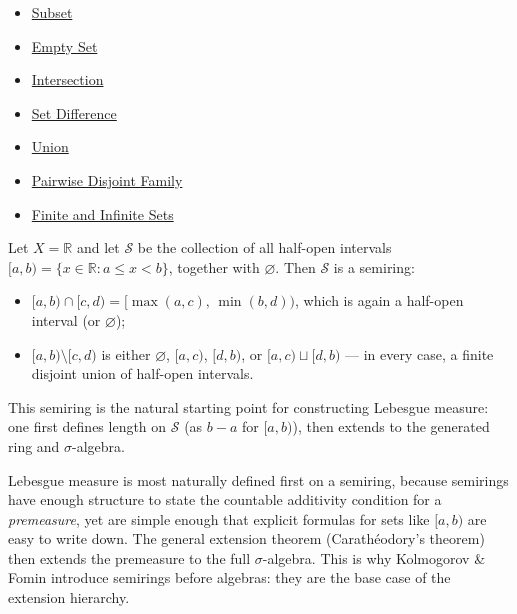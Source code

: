 \begin{dependencies}
\begin{itemize}
  \item \hyperref[def:subset]{Subset}
  \item \hyperref[def:empty-set]{Empty Set}
  \item \hyperref[def:intersection]{Intersection}
  \item \hyperref[def:set-difference]{Set Difference}
  \item \hyperref[def:union]{Union}
  \item \hyperref[def:pairwise-disjoint]{Pairwise Disjoint Family}
  \item \hyperref[def:finite-infinite]{Finite and Infinite Sets}
\end{itemize}
\end{dependencies}

\begin{example*}
\label{ex:semiring-intervals}
Let $X = \mathbb{R}$ and let $\mathcal{S}$ be the collection of all half-open
intervals $[a, b) = \{x \in \mathbb{R} : a \leq x < b\}$, together with
$\varnothing$. Then $\mathcal{S}$ is a semiring:
\begin{itemize}
\item $[a,b) \cap [c,d) = [\max(a,c),\, \min(b,d))$, which is again a half-open
  interval (or $\varnothing$);
\item $[a,b) \setminus [c,d)$ is either $\varnothing$, $[a,c)$, $[d,b)$, or
  $[a,c) \sqcup [d,b)$ — in every case, a finite disjoint union of half-open
  intervals.
\end{itemize}
This semiring is the natural starting point for constructing Lebesgue measure:
one first defines length on $\mathcal{S}$ (as $b - a$ for $[a,b)$), then
extends to the generated ring and $\sigma$-algebra.
\end{example*}

\begin{remark*}
Lebesgue measure is most naturally defined first on a semiring, because
semirings have enough structure to state the countable additivity condition for
a \emph{premeasure}, yet are simple enough that explicit formulas for sets like
$[a,b)$ are easy to write down. The general extension theorem (Carathéodory's
theorem) then extends the premeasure to the full $\sigma$-algebra. This is why
Kolmogorov \& Fomin introduce semirings before algebras: they are the base
case of the extension hierarchy.
\end{remark*}

